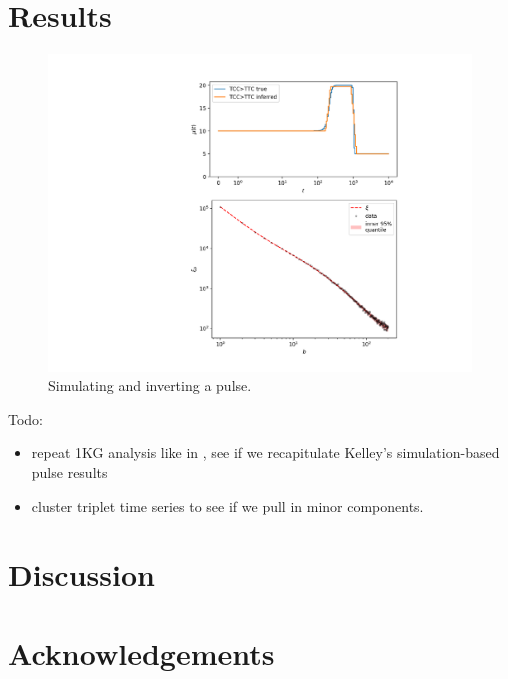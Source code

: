 \documentclass[11pt]{article}
\begin{document}
\section{Results}\label{sec:results}

\begin{figure}
  \centering
  \includegraphics[width=.7\textwidth]{figures/fit_teaser}
  \caption{Simulating and inverting a pulse.}
  \label{}
\end{figure}

Todo:
\begin{itemize}
\item repeat 1KG analysis like in \cite{Harris2017-fw}, see if we recapitulate Kelley's simulation-based pulse results
\item cluster triplet time series to see if we pull in minor components.
\end{itemize}


\section{Discussion}\label{sec:discussion}

\section{Acknowledgements}\label{sec:ack}



\end{document}
